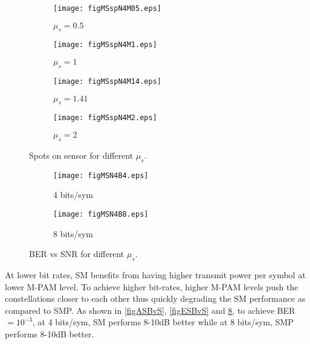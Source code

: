 \begin{figure}
	\centering
		\begin{subfigure}{0.49\textwidth}
			\centering
			\texttt{[image: figMSspN4M05.eps]}
			\caption{$\mu_{s}=0.5$}
			\label{figMSspN4M05}
		\end{subfigure}
		\hfill
		\begin{subfigure}{0.49\textwidth}
			\centering
			\texttt{[image: figMSspN4M1.eps]}
			\caption{$\mu_{s}=1$}
			\label{figMSspN4M1}
		\end{subfigure}
		\vfill
		\begin{subfigure}{0.49\textwidth}
			\centering
			\texttt{[image: figMSspN4M14.eps]}
			\caption{$\mu_{s}=1.41$}
			\label{figMSspN4M14}
		\end{subfigure}
		\hfill
		\begin{subfigure}{0.49\textwidth}
			\centering
		\texttt{[image: figMSspN4M2.eps]}
			\caption{$\mu_{s}=2$}
			\label{figMSspN4M2}
		\end{subfigure}
		
		\caption{Spots on sensor for different $\mu_{s}$.}
		\label{figMSSpots}
\end{figure}

\begin{figure}
	\centering
		\begin{subfigure}{\textwidth}
			\centering
			\texttt{[image: figMSN4B4.eps]}
			\caption{4 bits/sym}
			\label{figMSN4B4}
		\end{subfigure}
		
		\begin{subfigure}{\textwidth}
			\centering
			\texttt{[image: figMSN4B8.eps]}
			\caption{8 bits/sym}
			\label{figMSN4B8}
		\end{subfigure}
		
		\caption{BER vs SNR for different $\mu_{s}$.}
		\label{figMSBvS}
\end{figure}

At lower bit rates, SM benefits from having higher transmit power per symbol at lower M-PAM level. To achieve higher bit-rates, higher M-PAM levels push the constellations closer to each other thus quickly degrading the SM performance as compared to SMP. As shown in \figurename{ \ref{figASBvS}}, \figurename{ \ref{figESBvS}} and \figurename{ \ref{figMSBvS}}, to achieve BER$=10^{-3}$, at 4 bits/sym, SM performs 8-10dB better while at 8 bits/sym, SMP performs 8-10dB better.



